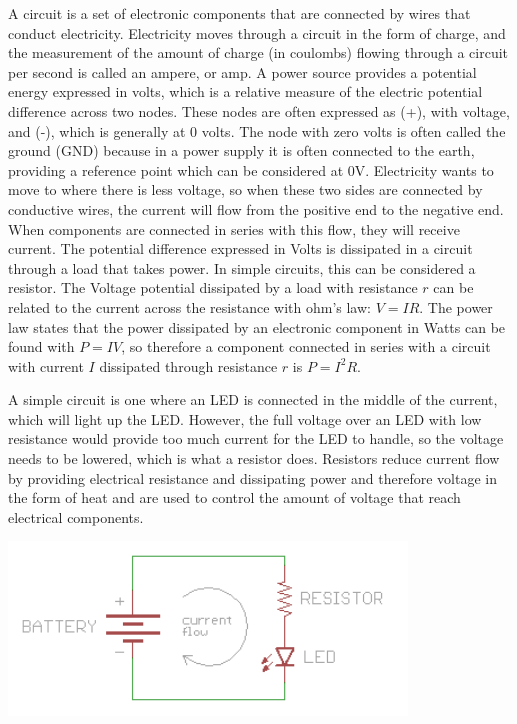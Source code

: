 \documentclass[12pt,]{article}
\begin{document}
A circuit is a set of electronic components that are connected by wires
that conduct electricity. Electricity moves through a circuit in the
form of charge, and the measurement of the amount of charge (in
coulombs) flowing through a circuit per second is called an ampere, or
amp. A power source provides a potential energy expressed in volts,
which is a relative measure of the electric potential difference across
two nodes. These nodes are often expressed as (+), with voltage, and
(-), which is generally at 0 volts. The node with zero volts is often
called the ground (GND) because in a power supply it is often connected
to the earth, providing a reference point which can be considered at 0V.
Electricity wants to move to where there is less voltage, so when these
two sides are connected by conductive wires, the current will flow from
the positive end to the negative end. When components are connected in
series with this flow, they will receive current. The potential
difference expressed in Volts is dissipated in a circuit through a load
that takes power. In simple circuits, this can be considered a resistor.
The Voltage potential dissipated by a load with resistance \(r\) can be
related to the current across the resistance with ohm's law: \(V=IR\).
The power law states that the power dissipated by an electronic
component in Watts can be found with \(P=IV\), so therefore a component
connected in series with a circuit with current \(I\) dissipated through
resistance \(r\) is \(P=I^2R\).

A simple circuit is one where an LED is connected in the middle of the
current, which will light up the LED. However, the full voltage over an
LED with low resistance would provide too much current for the LED to
handle, so the voltage needs to be lowered, which is what a resistor
does. Resistors reduce current flow by providing electrical resistance
and dissipating power and therefore voltage in the form of heat and are
used to control the amount of voltage that reach electrical components.

\begin{center}\includegraphics[width=400px]{assets/simple_circuit} \end{center}
\end{document}
